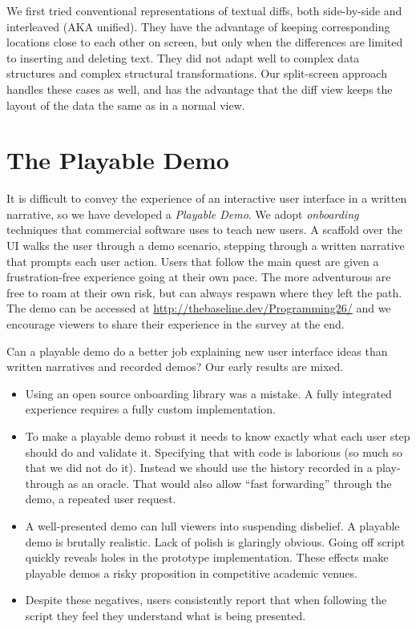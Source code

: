 \documentclass[english,submission]{programming}
\theoremstyle{definition}
\begin{document}
We first tried conventional representations of textual diffs, both side-by-side and interleaved (AKA unified). They have the advantage of keeping corresponding locations close to each other on screen, but only when the differences are limited to inserting and deleting text. They did not adapt well to complex data structures and complex structural transformations. Our split-screen approach handles these cases as well, and has the advantage that the diff view keeps the layout of the data the same as in a normal view.



\section{The Playable Demo}\label{demo}

It is difficult to convey the experience of an interactive user interface in a written narrative, so we have developed a \textit{Playable Demo}. We adopt \textit{onboarding} techniques that commercial software uses to teach new users. A scaffold over the UI walks the user through a demo scenario, stepping through a written narrative that prompts each user action. Users that follow the main quest are given a frustration-free experience going at their own pace. The more adventurous are free to roam at their own risk, but can always respawn where they left the path. The demo can be accessed at \url{http://thebaseline.dev/Programming26/} and we encourage viewers to share their experience in the survey at the end.

Can a playable demo do a better job explaining new user interface ideas than
written narratives and recorded demos? Our early results are mixed.

\begin{itemize}
\item Using an open source onboarding library was a mistake. A fully integrated experience requires a fully custom implementation.
\item To make a playable demo robust it needs to know exactly what each user step should do and validate it. Specifying that with code is laborious (so much so that we did not do it). Instead we should use the history recorded in a play-through as an oracle. That would also allow ``fast forwarding'' through the demo, a repeated user request.
\item A well-presented demo can lull viewers into suspending disbelief. A playable demo is brutally realistic. Lack of polish is glaringly obvious. Going off script quickly reveals holes in the prototype implementation. These effects make playable demos a risky proposition in competitive academic venues.
\item Despite these negatives, users consistently report that when following the script they feel they understand what is being presented.

\end{itemize}
\end{document}
